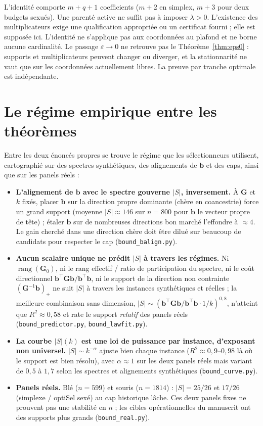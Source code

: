 \documentclass[11pt]{article}
\theoremstyle{plain}
\newcommand{\tp}{^{\top}}
\newcommand{\bb}{\mathbf{b}}
\newcommand{\bG}{\mathbf{G}}
\begin{document}
L'identité comporte $m+q+1$ coefficients ($m+2$ en simplex, $m+3$ pour deux budgets sexués). Une parenté active ne suffit pas à imposer $\lambda>0$. L'existence des multiplicateurs exige une qualification appropriée ou un certificat fourni ; elle est supposée ici. L'identité ne s'applique pas aux coordonnées au plafond et ne borne aucune cardinalité. Le passage $\varepsilon\to0$ ne retrouve pas le Théorème~\ref{thm:eps0} : supports et multiplicateurs peuvent changer ou diverger, et la stationnarité ne vaut que sur les coordonnées actuellement libres. La preuve par tranche optimale est indépendante.

\section{Le régime empirique entre les théorèmes}\label{sec:empirical}

Entre les deux énoncés propres se trouve le régime que les sélectionneurs utilisent, cartographié
sur des spectres synthétiques, des alignements de $\bb$ et des caps, ainsi que sur les panels
réels :

\begin{itemize}
\item \textbf{L'alignement de $\bb$ avec le spectre gouverne $|S|$, inversement.} À $\bG$ et $k$
  fixés, placer $\bb$ sur la direction propre dominante (chère en coancestrie) force un grand
  support (moyenne $|S| \approx 146$ sur $n = 800$ pour $\bb$ le vecteur propre de tête) ; étaler
  $\bb$ sur de nombreuses directions bon marché l'effondre à $\approx 4$. Le gain cherché dans une
  direction chère doit être dilué sur beaucoup de candidats pour respecter le cap
  (\texttt{bound\_balign.py}).
\item \textbf{Aucun scalaire unique ne prédit $|S|$ à travers les régimes.} Ni
  $\operatorname{rang}(\bG_0)$, ni le rang effectif / ratio de participation du spectre, ni le coût
  directionnel $\bb\tp\bG\bb/\bb\tp\bb$, ni le support de la direction non contrainte
  $(\bG^{-1}\bb)_+$ ne suit $|S|$ à travers les instances synthétiques et réelles ; la meilleure
  combinaison sans dimension, $|S| \sim (\bb\tp\bG\bb/\bb\tp\bb \cdot 1/k)^{0{,}8}$, n'atteint que
  $R^2 \approx 0{,}58$ et rate le support \emph{relatif} des panels réels (\texttt{bound\_predictor.py},
  \texttt{bound\_lawfit.py}).
\item \textbf{La courbe $|S|(k)$ est une loi de puissance par instance, d'exposant non universel.}
  $|S| \sim k^{-\alpha}$ ajuste bien chaque instance ($R^2 \approx 0{,}9$--$0{,}98$ là où le support
  est bien résolu), avec $\alpha \approx 1$ sur les deux panels réels mais variant de $0{,}5$ à
  $1{,}7$ selon les spectres et alignements synthétiques (\texttt{bound\_curve.py}).
\item \textbf{Panels réels.} Blé ($n = 599$) et souris ($n = 1814$) : $|S| = 25/26$ et $17/26$
  (simplexe / optiSel sexé) au cap historique lâche. Ces deux panels fixes ne prouvent pas une stabilité en $n$ ; les cibles opérationnelles du manuscrit ont des supports plus grands (\texttt{bound\_real.py}).
\end{itemize}
\end{document}
